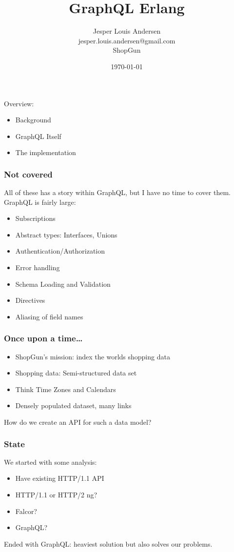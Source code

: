 \documentclass[lualatex]{beamer}
\author{Jesper Louis
  Andersen\\jesper.louis.andersen@gmail.com\\ShopGun}
\date{\today{}}
\title{GraphQL Erlang}
\begin{document}
\maketitle

\begin{frame}
  Overview:
  \begin{itemize}
  \item Background
  \item GraphQL Itself
  \item The implementation
  \end{itemize}
\end{frame}

\begin{frame}
  \frametitle{Not covered}
  All of these has a story within GraphQL, but I have no time to cover
  them. GraphQL is fairly large:
  \begin{itemize}
  \item Subscriptions
  \item Abstract types: Interfaces, Unions
  \item Authentication/Authorization
  \item Error handling
  \item Schema Loading and Validation
  \item Directives
  \item Aliasing of field names
  \end{itemize}
\end{frame}

\begin{frame}
  \frametitle{Once upon a time\ldots{}}
  \begin{itemize}
  \item ShopGun's mission: index the worlds shopping data
  \item Shopping data: Semi-structured data set
  \item Think Time Zones and Calendars
  \item Densely populated dataset, many links
  \end{itemize}

  How do we create an API for such a data model?
\end{frame}

\begin{frame}
  \frametitle{State}
  We started with some analysis:
  \begin{itemize}
  \item Have existing HTTP/1.1 API
  \item HTTP/1.1 or HTTP/2 ng?
  \item Falcor?
  \item GraphQL?
  \end{itemize}

  Ended with GraphQL: heaviest solution but also solves our problems.
\end{frame}
\end{document}
